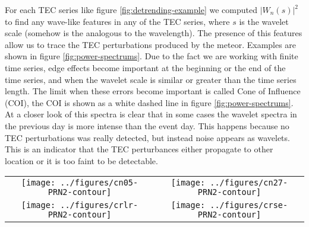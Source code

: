 For each TEC series like figure \ref{fig:detrending-example} we computed $|W_n(s)|^2$ to find any wave-like features in any of the TEC series, where $s$ is the wavelet scale (somehow is the analogous to the wavelength). The presence of this features allow us to trace the TEC perturbations produced by the meteor. Examples are shown in figure \ref{fig:power-spectrums}. Due to the fact we are working with finite time series, edge effects become important at the beginning or the end of the time series, and when the wavelet scale is similar or greater than the time series length. The limit when these errors become important is called Cone of Influence (COI), the COI is shown as a white dashed line in figure \ref{fig:power-spectrums}. At a closer look of this spectra is clear that in some cases the wavelet spectra in the previous day is more intense than the event day. This happens because no TEC perturbations was really detected, but instead noise appears as wavelets. This is an indicator that the TEC perturbances either propagate to other location or it is too faint to be detectable.


\begin{figure*}
  \begin{tabular}{cc}
  \texttt{[image: ../figures/cn05-PRN2-contour]}  & \texttt{[image: ../figures/cn27-PRN2-contour]}\\
  \texttt{[image: ../figures/crlr-PRN2-contour]}  & \texttt{[image: ../figures/crse-PRN2-contour]}
  \end{tabular}
  \label{fig:power-spectrums}
  \caption{Examples of power spectrums for event USG-09, PRN 2. Top left: Station CN05. Top Right: Station CN27. Bottom left: station CRLR. Bottom right: station CRSE. In each figure the left panel corresponds to the event day and the right panel corresponds to the previous day of the event. The white dashed lines correspond to the Cone of Influence, where all the wavelet spectrum below is subject to error.}
\end{figure*}

  

